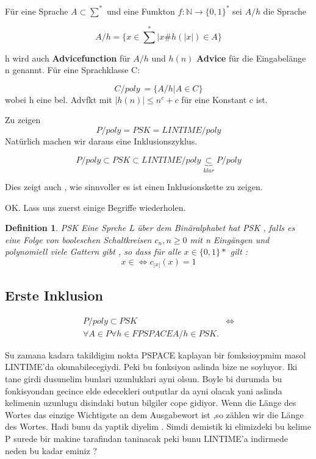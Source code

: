 \documentclass{article}
\newtheorem{definition}{Definition}[section]
\begin{document}
	Für eine Sprache $A \subset \sum^*$ und eine Fumkton $f : \mathbb{N} \rightarrow \{ 0, 1\}^*$ sei $A/h$ die Sprache

	\[
		A/h = \{ x \in {\sum}^* | x\#h(|x|) \in A \}
	\]

	h wird auch \textbf{Advicefunction} für $A/h$ und $h(n)$ \textbf{Advice} für die Eingabelänge n genannt. Für eine Sprachklasse C:

	\[
		C/poly \:= \{A/h | A \in C\}
	\]
	wobei h eine bel. Advfkt mit $|h(n)| \leq n^c + c$ für eine Konstant c ist.

	Zu zeigen 
	\[
		P/poly = PSK = LINTIME/poly
	\]
	Natürlich machen wir daraus eine Inklusionszyklus.

	\[
		P/poly \subset PSK \subset LINTIME/poly \underbrace{\subset}_{klar} P/poly
	\]

	Dies zeigt auch , wie sinnvoller es ist einen Inklusionskette zu zeigen.

	OK.
	Lass uns zuerst einige Begriffe wiederholen.

	\begin{definition}{PSK}
		Eine Sprche L über dem Binäralphabet hat PSK , falls es eine Folge von booleschen Schaltkreisen $c_n , n \geq 0 $
	    mit n Eingängen und polynomiell viele Gattern gibt , so dass für alle $x \in \{0,1\}*$  gilt :
	     \[x \in  \iff c_{|x|}(x) = 1 \] 
	\end{definition}

	\subsection*{Erste Inklusion}
		\begin{comment}
			\begin{align*}
				P/poly \subset PSK &\iff\\
				\forall L \in P/poly \subset PSK &\iff\\
				\forall L \in P \forall f \in poly : \{ x \in {\sum}^* | x \#f(|x|) \in L \} &\iff \\
				\exists M \in M_{DTM} \\
			\end{align*}
		\end{comment}

		\begin{align*}
			P/poly \subset PSK &\iff\\ 
			\forall A \in P \forall h \in FPSPACE A/h \in PSK.
		\end{align*}

		Su zamana kadara takildigim nokta PSPACE kaplayan bir fomksioypmim masol LINTIME'da okunabilecegiydi. Peki bu fonksiyon aslinda bize ne soyluyor. Iki tane girdi dusunelim bunlari uzunluklari ayni olsun. Boyle bi durumda bu fonkisyondan gecince elde edecekleri outputlar da ayni olacak yani aslinda kelimenin uzunlugu disindaki butun bilgiler cope gidiyor. Wenn die Länge des Wortes das einzige Wichtigste an dem Ausgabewort ist ,so zählen wir die Länge des Wortes. Hadi bunu da yaptik diyelim . Simdi demistik ki elimizdeki bu kelime P surede bir makine tarafindan taninacak peki bunu LINTIME'a indirmede neden bu kadar eminiz ?
\end{document}
